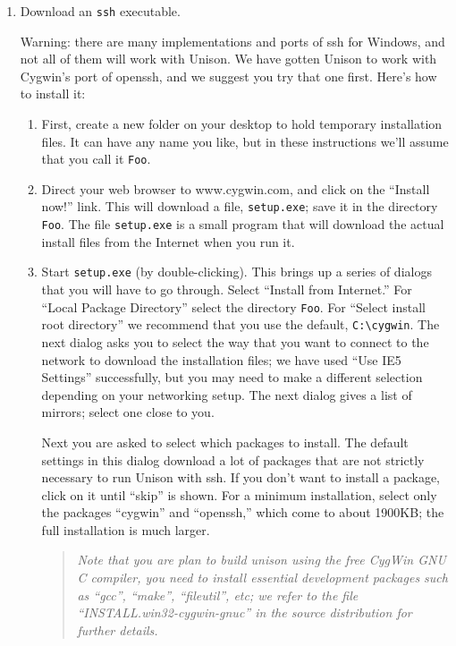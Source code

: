 \documentclass{article}
\begin{document}
\begin{enumerate}
\item Download an \verb|ssh| executable.  
  
Warning: there are many implementations and ports of ssh for
Windows, and not all of them will work with Unison.  We have gotten
Unison to work with Cygwin's port of openssh, and we suggest you try
that one first.  Here's how to install it:
\begin{enumerate}
\item First, create a new folder on your desktop to hold temporary
  installation files.  It can have any name you like, but in these
  instructions we'll assume that you call it \verb|Foo|.
\item Direct your web browser to www.cygwin.com, and click on the
  ``Install now!'' link.  This will download a file, \verb|setup.exe|;
  save it in the directory \verb|Foo|.  The file \verb|setup.exe| is a
  small program that will download the actual install files from
  the Internet when you run it.
\item Start \verb|setup.exe| (by double-clicking).  This brings up a
  series of dialogs that you will have to go through.  Select
  ``Install from Internet.''  For ``Local Package Directory'' select
  the directory \verb|Foo|.  For ``Select install root directory'' we
  recommend that you use the default, \verb|C:\cygwin|.  The next
  dialog asks you to select the way that you want to connect to the
  network to download the installation files; we have used ``Use IE5
  Settings'' successfully, but you may need to make a different
  selection depending on your networking setup.  The next dialog gives
  a list of mirrors; select one close to you.
  
  Next you are asked to select which packages to install.  The default
  settings in this dialog download a lot of packages that are not
  strictly necessary to run Unison with ssh.  If you don't want to
  install a package, click on it until ``skip'' is shown.  For a
  minimum installation, select only the packages ``cygwin'' and
  ``openssh,'' which come to about 1900KB; the full installation is
  much larger.  

  \begin{quote} \em Note that you are plan to build unison using the free
    CygWin GNU C compiler, you need to install essential development
    packages such as ``gcc'', ``make'', ``fileutil'', etc; we refer to
    the file ``INSTALL.win32-cygwin-gnuc'' in the source distribution
    for further details.
  \end{quote}


\end{enumerate}
\end{enumerate}
\end{document}
